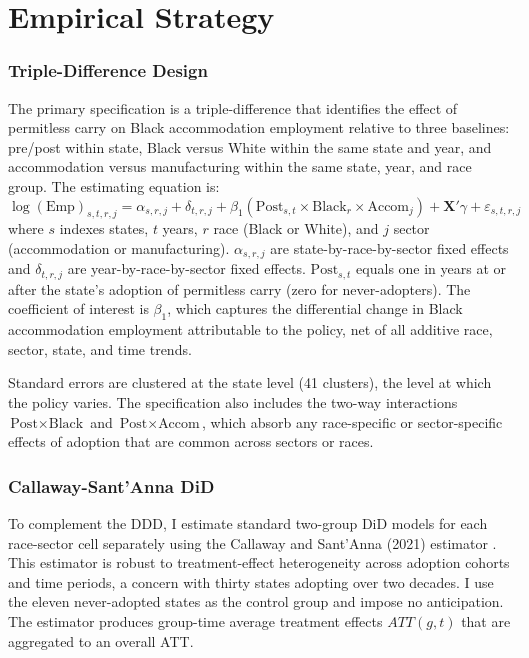 \documentclass[12pt]{article}
\begin{document}
\section{Empirical Strategy}
\label{sec:strategy}

\subsubsection*{Triple-Difference Design} The primary specification is a triple-difference that identifies the effect of permitless carry on Black accommodation employment relative to three baselines: pre/post within state, Black versus White within the same state and year, and accommodation versus manufacturing within the same state, year, and race group. The estimating equation is:
\begin{equation}
\log(\text{Emp})_{s,t,r,j} = \alpha_{s,r,j} + \delta_{t,r,j} + \beta_1(\text{Post}_{s,t} \times \text{Black}_r \times \text{Accom}_j) + \mathbf{X}'\gamma + \varepsilon_{s,t,r,j}
\label{eq:ddd}
\end{equation}
where $s$ indexes states, $t$ years, $r$ race (Black or White), and $j$ sector (accommodation or manufacturing). $\alpha_{s,r,j}$ are state-by-race-by-sector fixed effects and $\delta_{t,r,j}$ are year-by-race-by-sector fixed effects. $\text{Post}_{s,t}$ equals one in years at or after the state's adoption of permitless carry (zero for never-adopters). The coefficient of interest is $\beta_1$, which captures the differential change in Black accommodation employment attributable to the policy, net of all additive race, sector, state, and time trends.

Standard errors are clustered at the state level (41 clusters), the level at which the policy varies. The specification also includes the two-way interactions $\text{Post} \times \text{Black}$ and $\text{Post} \times \text{Accom}$, which absorb any race-specific or sector-specific effects of adoption that are common across sectors or races.

\subsubsection*{Callaway-Sant'Anna DiD} To complement the DDD, I estimate standard two-group DiD models for each race-sector cell separately using the Callaway and Sant'Anna (2021) estimator \citep{callaway2021difference}. This estimator is robust to treatment-effect heterogeneity across adoption cohorts and time periods, a concern with thirty states adopting over two decades. I use the eleven never-adopted states as the control group and impose no anticipation. The estimator produces group-time average treatment effects $ATT(g,t)$ that are aggregated to an overall ATT.
\end{document}
